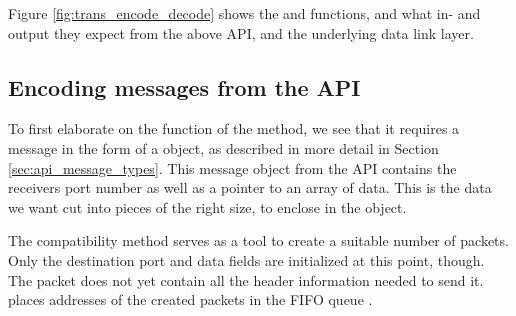 Figure \ref{fig:trans_encode_decode} shows the  and  functions, and what in- and output they expect from the above API, and the underlying data link layer.


\subsection{Encoding messages from the API}
To first elaborate on the function of the  method, we see that it requires a message in the form of a  object, as described in more detail in Section \ref{sec:api_message_types}. This message object from the API contains the receivers port number as well as a pointer to an array of data. This is the data we want cut into pieces of the right size, to enclose in the  object.

The compatibility method  serves as a tool to create a suitable number of packets. Only the destination port and data fields are initialized at this point, though. The packet does not yet contain all the header information needed to send it.  places addresses of the created packets in the FIFO queue .

